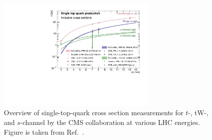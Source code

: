 \documentclass{PoS}
\begin{document}
\begin{figure}[htbp]
\begin{center}
\includegraphics[width=0.7\textwidth]{figures/singletop_sqrts.pdf}
\caption{\label{fig:xsec-overview}Overview of single-top-quark cross section measurements for $t$-, tW-, and $s$-channel by the CMS collaboration at various LHC energies. Figure is taken from Ref.~\cite{summary}.}
\end{center}
\end{figure}

\clearpage
\end{document}
